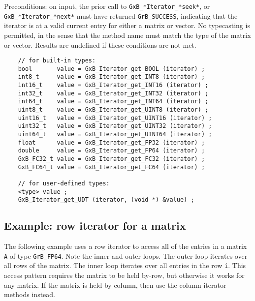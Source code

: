 \documentclass[12pt]{article}
\begin{document}
{Preconditions: on input, the prior call to \verb'GxB_*Iterator_*seek*', or
\verb'GxB_*Iterator_*next*' must have returned \verb'GrB_SUCCESS', indicating
that the iterator is at a valid current entry for either a matrix or vector.
No typecasting is permitted, in the sense that the method name must match the
type of the matrix or vector.
Results are undefined if these conditions are not met.

    {\footnotesize
    \begin{verbatim}
    // for built-in types:
    bool       value = GxB_Iterator_get_BOOL (iterator) ;
    int8_t     value = GxB_Iterator_get_INT8 (iterator) ;
    int16_t    value = GxB_Iterator_get_INT16 (iterator) ;
    int32_t    value = GxB_Iterator_get_INT32 (iterator) ;
    int64_t    value = GxB_Iterator_get_INT64 (iterator) ;
    uint8_t    value = GxB_Iterator_get_UINT8 (iterator) ;
    uint16_t   value = GxB_Iterator_get_UINT16 (iterator) ;
    uint32_t   value = GxB_Iterator_get_UINT32 (iterator) ;
    uint64_t   value = GxB_Iterator_get_UINT64 (iterator) ;
    float      value = GxB_Iterator_get_FP32 (iterator) ;
    double     value = GxB_Iterator_get_FP64 (iterator) ;
    GxB_FC32_t value = GxB_Iterator_get_FC32 (iterator) ;
    GxB_FC64_t value = GxB_Iterator_get_FC64 (iterator) ;

    // for user-defined types:
    <type> value ;
    GxB_Iterator_get_UDT (iterator, (void *) &value) ; \end{verbatim}}

\newpage
\subsection{Example: row iterator for a matrix}

The following example uses a row iterator to access all of the entries
in a matrix \verb'A' of type \verb'GrB_FP64'.  Note the inner and outer loops.
The outer loop iterates over all rows of the matrix.  The inner loop iterates
over all entries in the row \verb'i'.  This access pattern requires the matrix
to be held by-row, but otherwise it works for any matrix.  If the matrix is
held by-column, then use the column iterator methods instead.

}
\end{document}
